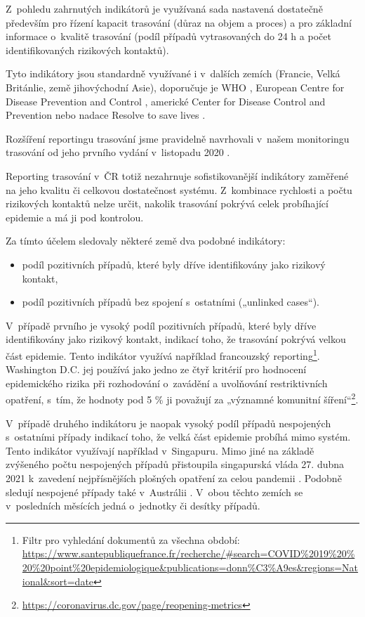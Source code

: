 Z~pohledu zahrnutých indikátorů je využívaná sada nastavená dostatečně především pro řízení kapacit trasování (důraz na objem a proces) a pro základní informace o~kvalitě trasování (podíl případů vytrasovaných do 24 h a počet identifikovaných rizikových kontaktů).

Tyto indikátory jsou standardně využívané i v~dalších zemích (Francie, Velká Británlie, země jihovýchodní Asie), doporučuje je WHO \cite{tr_WHO_2021}, European Centre for Disease Prevention and Control \cite{tr_ECDC_2020} , americké Center for Disease Control and Prevention \cite{tr_CDC_2020} nebo nadace Resolve to save lives \cite{tr_contact_tracing}.

Rozšíření reportingu trasování jsme pravidelně navrhovali v~našem monitoringu trasování od jeho prvního vydání v~listopadu 2020 \cite{tr_bisop07}.

Reporting trasování v~ČR totiž nezahrnuje sofistikovanější indikátory zaměřené na jeho kvalitu či celkovou dostatečnost systému. Z~kombinace rychlosti a počtu rizikových kontaktů nelze určit, nakolik trasování pokrývá celek probíhající epidemie a má ji pod kontrolou.

Za tímto účelem sledovaly některé země dva podobné indikátory:
\begin{itemize}
\item podíl pozitivních případů, které byly dříve identifikovány jako rizikový kontakt,
\item podíl pozitivních případů bez spojení s~ostatními („unlinked cases“).
\end{itemize}

V~případě prvního je vysoký podíl pozitivních případů, které byly dříve identifikovány jako rizikový kontakt, indikací toho, že trasování pokrývá velkou část epidemie. Tento indikátor využívá například francouzský reporting\footnote{Filtr pro vyhledání dokumentů za všechna období: \url{https://www.santepubliquefrance.fr/recherche/\#search=COVID\%2019\%20\%20\%20point\%20epidemiologique&publications=donn\%C3\%A9es&regions=National&sort=date}}. Washington D.C. jej používá jako jedno ze čtyř kritérií pro hodnocení epidemického rizika při rozhodování o~zavádění a uvolňování restriktivních opatření, s~tím, že hodnoty pod 5 \% ji považují za „významné komunitní šíření“\footnote{\url{https://coronavirus.dc.gov/page/reopening-metrics}}.


V~případě druhého indikátoru je naopak vysoký podíl případů nespojených s~ostatními případy indikací toho, že velká část epidemie probíhá mimo systém. Tento indikátor využívají například v~Singapuru. Mimo jiné na základě zvýšeného počtu nespojených případů přistoupila singapurská vláda 27. dubna 2021 k~zavedení nejpřísnějších plošných opatření za celou pandemii \cite{tr_Singapour}. Podobně sledují nespojené případy také v~Austrálii \cite{tr_australie}. V~obou těchto zemích se v~posledních měsících jedná o~jednotky či desítky případů.

